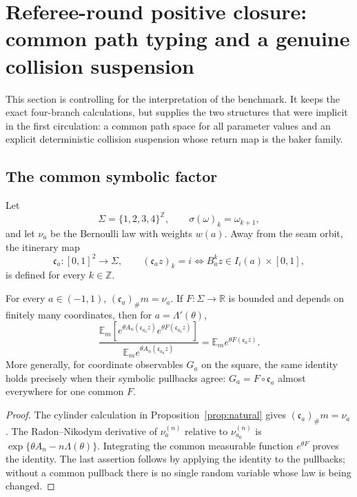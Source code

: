 \section{Referee-round positive closure: common path typing and a genuine collision suspension}
\label{sec:rr2-a1}

This section is controlling for the interpretation of the benchmark.  It
keeps the exact four-branch calculations, but supplies the two structures
that were implicit in the first circulation: a common path space for all
parameter values and an explicit deterministic collision suspension whose
return map is the baker family.

\subsection{The common symbolic factor}

Let
\[
 \Sigma=\{1,2,3,4\}^{\mathbb Z},\qquad
 \sigma(\omega)_k=\omega_{k+1},
\]
and let \(\nu_a\) be the Bernoulli law with weights \(w(a)\).  Away from the
seam orbit, the itinerary map
\[
 \mathfrak c_a:[0,1]^2\longrightarrow\Sigma,\qquad
 (\mathfrak c_a z)_k=i \Longleftrightarrow B_a^kz\in I_i(a)\times[0,1],
\]
is defined for every \(k\in\mathbb Z\).

\begin{theorem}
\label{thm:rr2-a1-common-path}
For every \(a\in(-1,1)\), \((\mathfrak c_a)_\#m=\nu_a\).  If
\(F:\Sigma\to\mathbb R\) is bounded and depends on finitely many coordinates,
then for \(a=\Lambda'(\theta)\),
\[
 \frac{\mathbb E_m\!\left[
 e^{\theta A_n(\mathfrak c_{a_0}z)}
 e^{\theta F(\mathfrak c_{a_0}z)}\right]}
 {\mathbb E_m e^{\theta A_n(\mathfrak c_{a_0}z)}}
 =
 \mathbb E_m e^{\theta F(\mathfrak c_a z)} .
\]
More generally, for coordinate observables \(G_a\) on the square, the same
identity holds precisely when their symbolic pullbacks agree:
\(G_a=F\circ\mathfrak c_a\) almost everywhere for one common \(F\).
\end{theorem}

\begin{proof}
The cylinder calculation in Proposition~\ref{prop:natural} gives
\((\mathfrak c_a)_\#m=\nu_a\).  The Radon--Nikodym derivative of
\(\nu_a^{(n)}\) relative to \(\nu_{a_0}^{(n)}\) is
\(\exp\{\theta A_n-n\Lambda(\theta)\}\).  Integrating the common measurable
function \(e^{\theta F}\) proves the identity.  The last assertion follows by
applying the identity to the pullbacks; without a common pullback there is no
single random variable whose law is being changed.
\end{proof}

